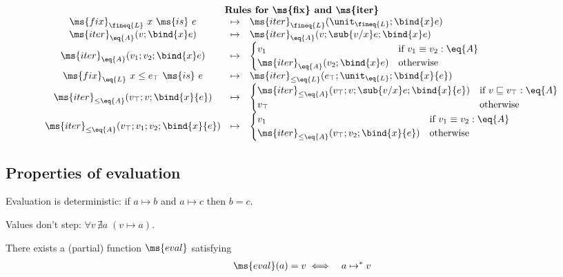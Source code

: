 \documentclass{article}
\newcommand{\ale}{\sqsubseteq}
\newcommand{\aeq}{\equiv}
\newcommand{\tfix}[2]{\ms{fix}_{#1}~{#2}~\ms{is}~}
\newcommand{\tfixle}[3]{\tfix{#1}{#2 \le #3}}
\newcommand{\iter}[4]{\ms{iter}_{#1}({#2}; \bind{#3}#4)}
\newcommand{\iterstep}[5]{\ms{iter}_{#1}({#2}; {#3}; {\bind{#4}#5})}
\newcommand{\iterle}[5]{\ms{iter}_{{\le}#1}({#2}; {#3}; \bind{#4}{#5})}
\newcommand{\iterlestep}[6]{\ms{iter}_{{\le}#1}({#2}; {#3}; {#4}; \bind{#5}{#6})}
\newcommand{\step}{\mapsto}
\newcommand{\steps}{\step^*}
\begin{document}
\[\begin{array}{ccl}
  \vspace{0.5em}\\
  \multicolumn{3}{c}{\textbf{Rules for \ms{fix} and \ms{iter}}}\\
  \tfix{\fineq{L}}{x}{e} &\step& \iter{\fineq{L}}{\unit_{\fineq{L}}}{x}{e}\\
  \iter{\eq{A}}{v}{x}{e} &\step& \iterstep{\eq{A}}{v}{\sub{v/x} e}{x}{e}\\
  \iterstep{\eq{A}}{v_1}{v_2}{x}{e}
  &\step& \begin{cases}
    v_1 & \text{if}~{v_1 \aeq v_2 : \eq{A}}\\
    \iter{\eq{A}}{v_2}{x}{e} & \text{otherwise}
  \end{cases}\\
  \tfixle{\eq{L}}{x}{e_\top}{e} &\step& \iterle{\eq{L}}{e_\top}{\unit_{\eq{L}}}{x}{e}\\
  \iterle{\eq{A}}{v_\top}{v}{x}{e}
  &\step& \begin{cases}
    \iterlestep{\eq{A}}{v_\top}{v}{\sub{v/x} e}{x}{e} & \text{if}~{v \ale v_\top : \eq{A}}\\
    v_\top & \text{otherwise}
  \end{cases}\\
  \iterlestep{\eq{A}}{v_\top}{v_1}{v_2}{x}{e}
  &\step& \begin{cases}
    v_1 &\text{if}~{v_1 \aeq v_2 : \eq{A}}\\
    \iterle{\eq{A}}{v_\top}{v_2}{x}{e} & \text{otherwise}
  \end{cases}
\end{array}
\]

\subsection{Properties of evaluation}

\begin{theorem}\label{thm:determinism}
  Evaluation is deterministic: if $a \step b$ and $a \step c$ then $b = c$.
\end{theorem}

\begin{theorem}\label{thm:valuesdontstep}
  Values don't step: $\forall v\, \nexists a\; (v \step a)$.
\end{theorem}

\newcommand{\evalfn}{\ms{eval}}
\begin{corollary}
  \label{cor:evalfn}
  There exists a (partial) function $\evalfn$ satisfying
  \begin{eqnarray*}
    \evalfn(a) = v &\iff& a \steps v
  \end{eqnarray*}
\end{corollary}
\end{document}
